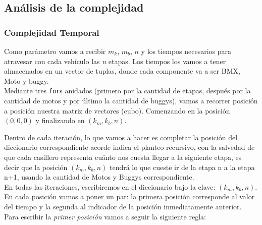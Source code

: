 \newpage

\subsection{An\'alisis de la complejidad}

\subsubsection{Complejidad Temporal}

Como par\'ametro vamos a recibir $m_k$, $m_b$, $n$ y los tiempos necesarios para atravesar con cada veh\'iculo las \emph{n} etapas. Los tiempos los vamos a tener almacenados en un vector de tuplas, donde cada componente va a ser BMX, Moto y buggy.\\

Mediante tres \texttt{for}s anidados (primero por la cantidad de etapas, despu\'es por la cantidad de motos y por \'ultimo la cantidad de buggys), vamos a recorrer posici\'on a posici\'on nuestra matriz de vectores (cubo). Comenzando en la posici\'on $(0,0,0)$ y finalizando en  $(k_{m},k_{b},n)$.

Dentro de cada iteraci\'on, lo que vamos a hacer es completar la posici\'on del diccionario correspondiente acorde indica el planteo recursivo, con la salvedad de que cada casillero representa cu\'anto nos cuesta llegar a la siguiente etapa, es decir que la posici\'on $(k_{m},k_{b},n)$ tendr\'a lo que cueste ir de la etapa n a la etapa n+1, usando la cantidad de Motos y Buggys correspondiente.\\


En todas las iteraciones, escribiremos en el diccionario bajo la clave:  $(k{_m}, k{_b}, n)$. En cada posici\'on vamos a poner un par: la primera posici\'on corresponde al valor del tiempo y la segunda al indicador de la posici\'on inmediatamente anterior.\\

Para escribir la \emph{primer posici\'on} vamos a seguir la siguiente regla:

